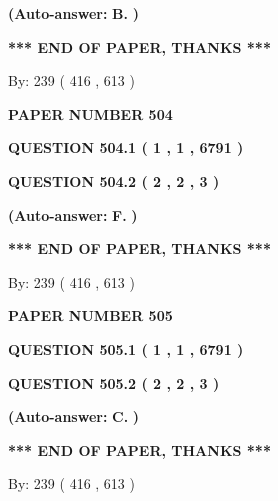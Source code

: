 \documentclass[12pt]{article}
\begin{document}
 
{\textbf{(Auto-answer:}}
{\textbf{\large{
B.}}}
{\textbf{)}}
 
 
   
   
   
   
\vspace{1.0in} 
{\textbf{\large{ *** END OF PAPER, THANKS *** }}} 
   
   
\hspace{1.0in} By: 
 239 ( 416 ,  613 )
   
   
   
   
\newpage 
\setcounter{page}{ 
   504001 } 
   
   
 {\textbf{ \Large{ PAPER NUMBER  504  }}}
   
   
   
   
  
  
{\textbf{\large{QUESTION
504.1 
 ( 1 , 1 , 6791 )
}}}
  
  
{\textbf{\large{QUESTION
504.2 
 ( 2 , 2 , 3 )
}}}
 
 
{\textbf{(Auto-answer:}}
{\textbf{\large{
F.}}}
{\textbf{)}}
 
 
   
   
   
   
\vspace{1.0in} 
{\textbf{\large{ *** END OF PAPER, THANKS *** }}} 
   
   
\hspace{1.0in} By: 
 239 ( 416 ,  613 )
   
   
   
   
\newpage 
\setcounter{page}{ 
   505001 } 
   
   
 {\textbf{ \Large{ PAPER NUMBER  505  }}}
   
   
   
   
  
  
{\textbf{\large{QUESTION
505.1 
 ( 1 , 1 , 6791 )
}}}
  
  
{\textbf{\large{QUESTION
505.2 
 ( 2 , 2 , 3 )
}}}
 
 
{\textbf{(Auto-answer:}}
{\textbf{\large{
C.}}}
{\textbf{)}}
 
 
   
   
   
   
\vspace{1.0in} 
{\textbf{\large{ *** END OF PAPER, THANKS *** }}} 
   
   
\hspace{1.0in} By: 
 239 ( 416 ,  613 )
   
   
   
   
\newpage 
\setcounter{page}{ 
   506001 } 
   
\end{document}
